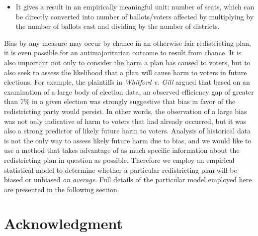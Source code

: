 \documentclass[preprint,12pt]{article}
\begin{document}
\begin{itemize}
\item It gives a result in an empirically meaningful unit: number of seats, which can be directly converted into number of ballots/voters affected by multiplying by the number of ballots cast and dividing by the number of districts.

\end{itemize}

Bias by any measure may occur by chance in an otherwise fair redistricting plan, it is even possible for an antimajoritarian outcome to result from chance.
It is also important not only to consider the harm a plan has caused to voters, but to also seek to assess the likelihood that a plan will cause harm to voters in future elections.
For example, the plaintiffs in \emph{Whitford v. Gill} argued that based on an examination of a large body of election data, an observed efficiency gap of greater than 7\% in a given election was strongly suggestive that bias in favor of the redistricting party would persist.
In other words, the observation of a large bias was not only indicative of harm to voters that had already occurred, but it was also a strong predictor of likely future harm to voters.
Analysis of historical data is not the only way to assess likely future harm due to bias, and we would like to use a method that takes advantage of as much specific information about the redistricting plan in question as possible.
Therefore we employ an empirical statistical model to determine whether a particular redistricting plan will be biased or unbiased \emph{on average}.
Full details of the particular model employed here are presented in the following section.

\clearpage
\section*{Acknowledgment}
\section*{}


\clearpage
\end{document}
